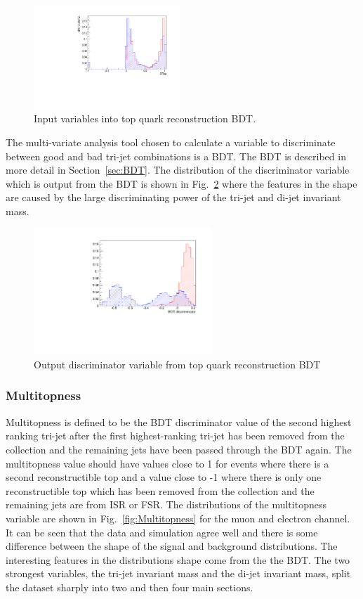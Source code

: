\begin{figure}[ht!]
     \includegraphics[width=0.49\textwidth]{images/Run1/BTag.pdf}          
    \caption{Input variables into top quark reconstruction BDT.}
    \label{fig:TopBDTinput}
\end{figure}

The multi-variate analysis tool chosen to calculate a variable to discriminate between good and bad tri-jet combinations is a BDT. The BDT is described in more detail in Section~\ref{sec:BDT}. The distribution of the discriminator variable which is output from the BDT is shown in Fig.~\ref{fig:TopBDToutput} where the features in the shape are caused by the large discriminating power of the tri-jet and di-jet invariant mass.
\begin{figure}[!ht]
\centering
    \includegraphics[width=0.6\textwidth]{images/Run1/BDT_Disc.pdf}
    \caption{Output discriminator variable from top quark reconstruction BDT}
    \label{fig:TopBDToutput}
\end{figure}

\subsubsection*{Multitopness}
Multitopness is defined to be the BDT discriminator value of the second highest ranking tri-jet after the first highest-ranking tri-jet has been removed from the collection and the remaining jets have been passed through the BDT again. The multitopness value should have values close to 1 for events where there is a second reconstructible top and a value close to -1 where there is only one reconstructible top which has been removed from the collection and the remaining jets are from ISR or FSR. The distributions of the multitopness variable are shown in Fig.~\ref{fig:Multitopness} for the muon and electron channel. It can be seen that the data and simulation agree well and there is some difference between the shape of the signal and background distributions. The interesting features in the distributions shape come from the the BDT. The two strongest variables, the tri-jet invariant mass and the di-jet invariant mass, split the dataset sharply into two and then four main sections.

